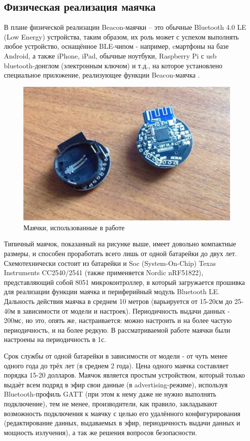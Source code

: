 \subsection{Физическая реализация маячка}

В плане физической реализации Beacon-маячки – это обычные Bluetooth 4.0 LE (Low Energy) устройства, таким образом, их роль может с успехом выполнять любое устройство, оснащённое BLE-чипом - например, cмартфоны на базе Android, а также iPhone, iPad, обычные ноутбуки, Raspberry Pi с usb bluetooth-донглом (электронным ключом) и т.д., на которое установлено специальное приложение, реализующее функции Beacon-маячка \cite{web:HabrBig}.

\begin{figure}[h]
    \centering
    \includegraphics[scale=0.4]{img/beacons.png}
    \caption{Маячки, использованные в работе}
\end{figure}

Типичный маячок, показанный на рисунке выше, имеет довольно компактные размеры, и способен проработать всего лишь от одной батарейки до двух лет. Схемотехнически состоит из батарейки и Soc (System-On-Chip) Texas Instruments CC2540/2541 (также применяется Nordic nRF51822), представляющий собой 8051 микроконтроллер, в который загружается прошивка для реализации функции маячка и периферийный модуль Bluetooth LE. Дальность действия маячка в среднем 10 метров (варьируется от 15-20см до 25-40м в зависимости от модели и настроек). Периодичность выдачи данных - 200мс, но это, опять же, настраивается: можно настроить и на более частую периодичность, и на более редкую. В рассматриваемой работе маячки были настроены на периодичность в 1с.

Срок службы от одной батарейки в зависимости от модели - от чуть менее одного года до трёх лет (в среднем 2 года). Цена одного маячка составляет порядка 15-20 долларов. Маячок является простым устройством, который только выдаёт всем подряд в эфир свои данные (в advertising-режиме), используя Bluetooth-профиль GATT (при этом к нему даже не нужно выполнять подключение), тем не менее, производители, как правило, закладывают возможность подключения к маячку с целью его удалённого конфигурирования (редактирование данных, выдаваемых в эфир, периодичность выдачи данных и мощность излучения), а так же решения вопросов безопасности.